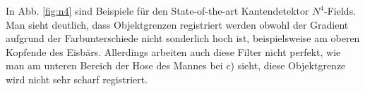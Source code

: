 In Abb. \ref{fig:n4} sind Beispiele für den State-of-the-art Kantendetektor $N^4$-Fields. Man sieht deutlich, dass Objektgrenzen registriert werden obwohl der Gradient aufgrund der Farbunterschiede nicht sonderlich hoch ist, beispielsweise am oberen Kopfende des Eisbärs. Allerdings arbeiten auch diese Filter nicht perfekt, wie man am unteren Bereich der Hose des Mannes bei c) sieht, diese Objektgrenze wird nicht sehr scharf registriert. 


\begin{figure}[H]
	\centering
	\hfill
	
	\hfill
	

\end{figure}
\label{fig:n4}




